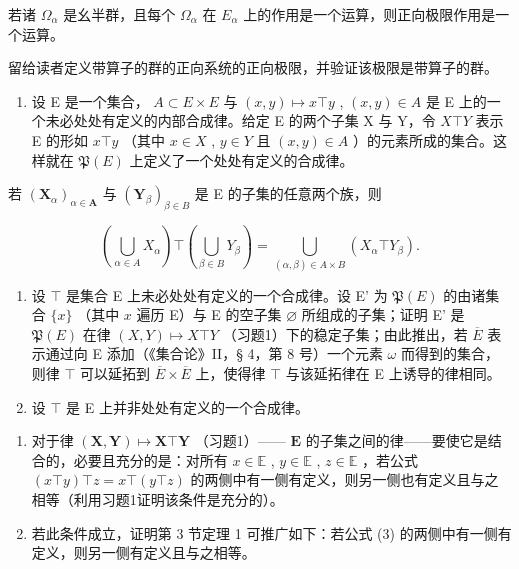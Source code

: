 若诸 \(\Omega_{\alpha}\) 是幺半群，且每个 \(\Omega_{\alpha}\) 在 \(E_{\alpha}\) 上的作用是一个运算，则正向极限作用是一个运算。

留给读者定义带算子的群的正向系统的正向极限，并验证该极限是带算子的群。

\BourbakiExercisesSection

\begin{enumerate}
\def\labelenumi{\arabic{enumi}.}
\tightlist
\item
  设 E 是一个集合， \(A \subset E \times E\) 与 \((x, y) \mapsto x \top y\) , \((x, y) \in A\) 是 E 上的一个未必处处有定义的内部合成律。给定 E 的两个子集 X 与 Y，令 \(X \top Y\) 表示 E 的形如 \(x \top y\) （其中 \(x \in X\) , \(y \in Y\) 且 \((x, y) \in A\) ）的元素所成的集合。这样就在 \(\mathfrak{P}(E)\) 上定义了一个处处有定义的合成律。
\end{enumerate}

若 \((\mathbf{X}_{\alpha})_{\alpha \in \mathbf{A}}\) 与 \((\mathbf{Y}_{\beta})_{\beta \in B}\) 是 E 的子集的任意两个族，则

\[
\left(\bigcup_ {\alpha \in A} X _ {\alpha}\right) \top \left(\bigcup_ {\beta \in B} Y _ {\beta}\right) = \bigcup_ {(\alpha , \beta) \in A \times B} (X _ {\alpha} \top Y _ {\beta}).
\]

\begin{enumerate}
\def\labelenumi{\arabic{enumi}.}
\setcounter{enumi}{1}
\item
  设 \(\top\) 是集合 E 上未必处处有定义的一个合成律。设 E' 为 \(\mathfrak{P}(E)\) 的由诸集合 \(\{x\}\) （其中 \(x\) 遍历 E）与 E 的空子集 \(\varnothing\) 所组成的子集；证明 E' 是 \(\mathfrak{P}(E)\) 在律 \((X,Y)\mapsto X\top Y\) （习题1）下的稳定子集；由此推出，若 \(\overline{E}\) 表示通过向 E 添加（《集合论》II，§ 4，第 8 号）一个元素 \(\omega\) 而得到的集合，则律 \(\top\) 可以延拓到 \(\overline{E} \times \overline{E}\) 上，使得律 \(\top\) 与该延拓律在 E 上诱导的律相同。
\item
  设 \(\top\) 是 E 上并非处处有定义的一个合成律。
\end{enumerate}

\begin{enumerate}
\def\labelenumi{(\alph{enumi})}
\item
  对于律 \((\mathbf{X}, \mathbf{Y}) \mapsto \mathbf{X} \top \mathbf{Y}\) （习题1）—— \(\mathbf{E}\) 的子集之间的律——要使它是结合的，必要且充分的是：对所有 \(x \in \mathbb{E}\) , \(y \in \mathbb{E}\) , \(z \in \mathbb{E}\) ，若公式 \((x \top y) \top z = x \top (y \top z)\) 的两侧中有一侧有定义，则另一侧也有定义且与之相等（利用习题1证明该条件是充分的）。
\item
  若此条件成立，证明第 3 节定理 1 可推广如下：若公式 (3) 的两侧中有一侧有定义，则另一侧有定义且与之相等。
\end{enumerate}

